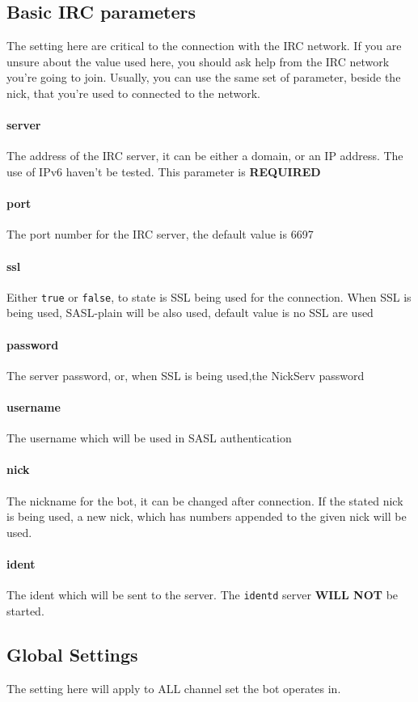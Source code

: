 \documentclass[a4paper,12pt,titlepage]{article}
\begin{document}
\subsection{Basic IRC parameters}
The setting here are critical to the connection with the IRC network. If you are unsure about the value used here, you should ask help from the IRC network you're going to join. Usually, you can use the same set of parameter, beside the nick, that you're used to connected to the network.
\paragraph{server} The address of the IRC server, it can be either a domain, or an IP address. The use of IPv6 haven't be tested.  This parameter is \textbf{REQUIRED}
\paragraph{port} The port number for the IRC server, the default value is 6697
\paragraph{ssl} Either \texttt{true} or \texttt{false}, to state is SSL being used for the connection. When SSL is being used, SASL-plain will be also used, default value is no SSL are used
\paragraph{password} The server password, or, when SSL is being used,the NickServ password
\paragraph{username} The username which will be used in SASL authentication
\paragraph{nick} The nickname for the bot, it can be changed after connection. If the stated nick is being used, a new nick, which has numbers  appended to the given nick will be used.
\paragraph{ident} The ident which will be sent to the server. The \texttt{identd} server \textbf{WILL NOT} be started. 
\subsection{Global Settings}
The setting here will apply to ALL channel set the bot operates in.
\end{document}
